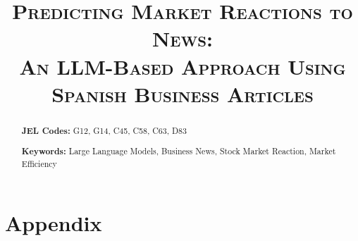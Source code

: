\documentclass[11pt,a4paper]{article}
\title{\textsc{
{\huge Predicting Market Reactions to News:} 
\\
{\Large An LLM-Based Approach Using Spanish Business Articles }
}}
\author[1]{
{  
}

%

}
\date{}
\begin{document}
\maketitle
\thispagestyle{empty}
\begin{abstract}


\mx 
\noindent\textbf{JEL Codes:} G12, G14, C45, C58, C63, D83

\sx 
\noindent\textbf{Keywords:} Large Language Models, Business News, Stock Market Reaction, Market Efficiency

\end{abstract}

\maketitle


\newpage
\setcounter{page}{1}











%




%

\newpage
\processdelayedfloats 
\renewcommand{\thefigure}{A\arabic{figure}} 
\renewcommand{\thetable}{A\arabic{table}}

\appendix
\section{Appendix}


\end{document}
